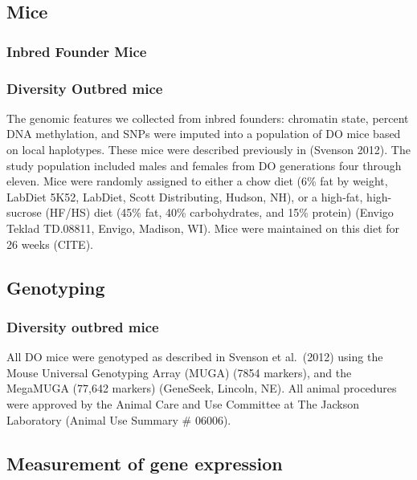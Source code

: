 \documentclass[10pt,letterpaper]{article}
\begin{document}
\hypertarget{mice}{%
\subsection{Mice}\label{mice}}

\hypertarget{inbred-founder-mice}{%
\subsubsection{Inbred Founder Mice}\label{inbred-founder-mice}}

\hypertarget{diversity-outbred-mice}{%
\subsubsection{Diversity Outbred mice}\label{diversity-outbred-mice}}

The genomic features we collected from inbred founders: chromatin state,
percent DNA methylation, and SNPs were imputed into a population of DO
mice based on local haplotypes. These mice were described previously in
(Svenson 2012). The study population included males and females from DO
generations four through eleven. Mice were randomly assigned to either a
chow diet (6\% fat by weight, LabDiet 5K52, LabDiet, Scott Distributing,
Hudson, NH), or a high-fat, high-sucrose (HF/HS) diet (45\% fat, 40\%
carbohydrates, and 15\% protein) (Envigo Teklad TD.08811, Envigo,
Madison, WI). Mice were maintained on this diet for 26 weeks (CITE).

\hypertarget{genotyping}{%
\subsection{Genotyping}\label{genotyping}}

\hypertarget{diversity-outbred-mice-1}{%
\subsubsection{Diversity outbred mice}\label{diversity-outbred-mice-1}}

All DO mice were genotyped as described in Svenson et al.~(2012) using
the Mouse Universal Genotyping Array (MUGA) (7854 markers), and the
MegaMUGA (77,642 markers) (GeneSeek, Lincoln, NE). All animal procedures
were approved by the Animal Care and Use Committee at The Jackson
Laboratory (Animal Use Summary \# 06006).

\hypertarget{measurement-of-gene-expression}{%
\subsection{Measurement of gene
expression}\label{measurement-of-gene-expression}}
\end{document}
